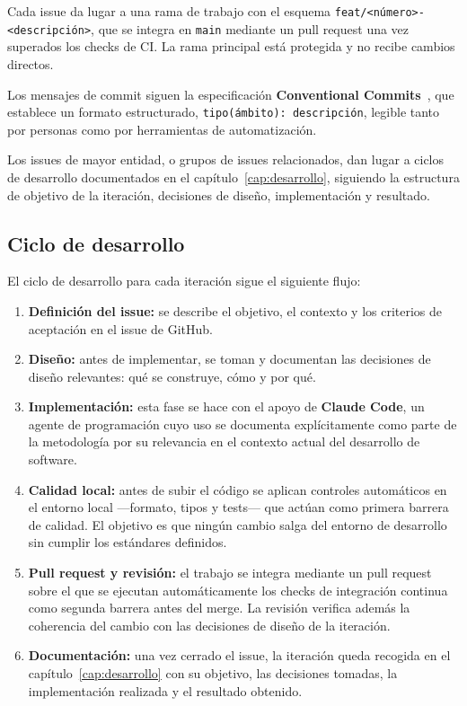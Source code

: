 Cada issue da lugar a una rama de trabajo con el esquema
\texttt{feat/<número>-<descripción>}, que se integra en \texttt{main} mediante
un pull request una vez superados los checks de CI. La rama principal está
protegida y no recibe cambios directos.

Los mensajes de commit siguen la especificación \textbf{Conventional
Commits}~\cite{conventionalCommits}, que establece un formato estructurado,
\texttt{tipo(ámbito): descripción}, legible tanto por personas como por
herramientas de automatización.

Los issues de mayor entidad, o grupos de issues relacionados, dan lugar a ciclos
de desarrollo documentados en el capítulo~\ref{cap:desarrollo}, siguiendo la
estructura de objetivo de la iteración, decisiones de diseño, implementación y
resultado.

\subsection{Ciclo de desarrollo}

El ciclo de desarrollo para cada iteración sigue el siguiente flujo:

\begin{enumerate}
    \item \textbf{Definición del issue:} se describe el objetivo, el contexto y
    los criterios de aceptación en el issue de GitHub.

    \item \textbf{Diseño:} antes de implementar, se toman y documentan las
    decisiones de diseño relevantes: qué se construye, cómo y por qué.

    \item \textbf{Implementación:} esta fase se hace con el apoyo
    de \textbf{Claude Code}\cite{claudeCode}, un agente de programación
    cuyo uso se documenta explícitamente como parte de la metodología por su
    relevancia en el contexto actual del desarrollo de software.

    \item \textbf{Calidad local:} antes de subir el código se aplican controles
    automáticos en el entorno local —formato, tipos y tests— que actúan como
    primera barrera de calidad. El objetivo es que ningún cambio salga del
    entorno de desarrollo sin cumplir los estándares definidos.

    \item \textbf{Pull request y revisión:} el trabajo se integra mediante un
    pull request sobre el que se ejecutan automáticamente los checks de
    integración continua como segunda barrera antes del merge. La revisión
    verifica además la coherencia del cambio con las decisiones de diseño
    de la iteración.

    \item \textbf{Documentación:} una vez cerrado el issue, la iteración queda
    recogida en el capítulo~\ref{cap:desarrollo} con su objetivo, las decisiones
    tomadas, la implementación realizada y el resultado obtenido.
\end{enumerate}

